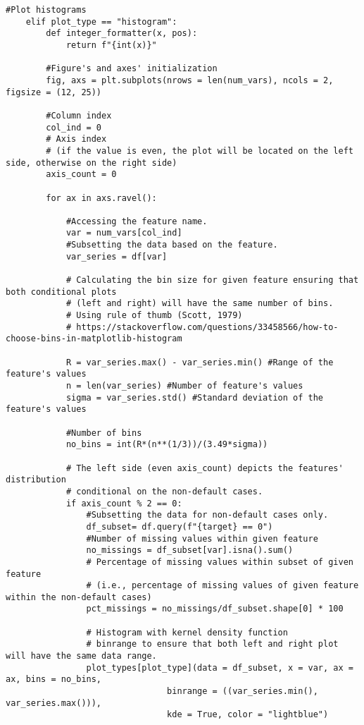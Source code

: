 \begin{lstlisting}[basicstyle=\footnotesize\ttfamily]
    #Plot histograms
    elif plot_type == "histogram":
        def integer_formatter(x, pos):
            return f"{int(x)}"

        #Figure's and axes' initialization
        fig, axs = plt.subplots(nrows = len(num_vars), ncols = 2, figsize = (12, 25))

        #Column index
        col_ind = 0
        # Axis index
        # (if the value is even, the plot will be located on the left side, otherwise on the right side)
        axis_count = 0

        for ax in axs.ravel():

            #Accessing the feature name.
            var = num_vars[col_ind]
            #Subsetting the data based on the feature.
            var_series = df[var]

            # Calculating the bin size for given feature ensuring that both conditional plots
            # (left and right) will have the same number of bins.
            # Using rule of thumb (Scott, 1979)
            # https://stackoverflow.com/questions/33458566/how-to-choose-bins-in-matplotlib-histogram
       
            R = var_series.max() - var_series.min() #Range of the feature's values
            n = len(var_series) #Number of feature's values
            sigma = var_series.std() #Standard deviation of the feature's values
        
            #Number of bins
            no_bins = int(R*(n**(1/3))/(3.49*sigma))

            # The left side (even axis_count) depicts the features' distribution
            # conditional on the non-default cases.
            if axis_count % 2 == 0:
                #Subsetting the data for non-default cases only.
                df_subset= df.query(f"{target} == 0")
                #Number of missing values within given feature
                no_missings = df_subset[var].isna().sum()
                # Percentage of missing values within subset of given feature
                # (i.e., percentage of missing values of given feature within the non-default cases)
                pct_missings = no_missings/df_subset.shape[0] * 100

                # Histogram with kernel density function
                # binrange to ensure that both left and right plot will have the same data range.
                plot_types[plot_type](data = df_subset, x = var, ax = ax, bins = no_bins,
                                binrange = ((var_series.min(), var_series.max())),
                                kde = True, color = "lightblue")
 

\end{lstlisting}
